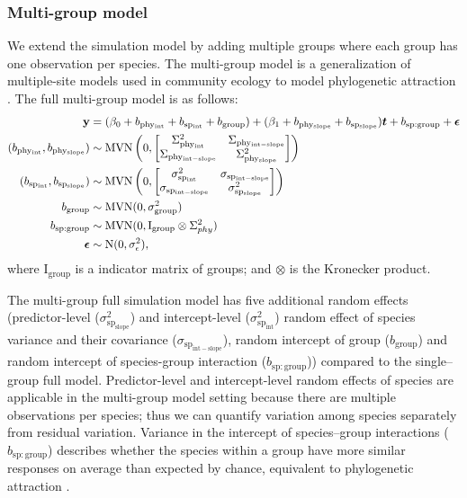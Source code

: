 \documentclass[12pt]{article}
\begin{document}
\subsubsection*{Multi-group model}

We extend the simulation model by adding multiple groups where each group has one observation per species. 
The multi-group model is a generalization of multiple-site models used in community ecology to model phylogenetic attraction \citep{helmus2007separating}. 
The full multi-group model is as follows: 
\begin{equation}
\begin{aligned}
{\mathbf y} & = (\beta_0 + b_{\mathrm{phy_{int}}} + b_{\mathrm{sp_{int}}} + b_{\mathrm{group}}) + (\beta_1 + b_{\mathrm{phy_{slope}}} + b_{\mathrm{sp_{slope}}}) \bm{t} + b_{\mathrm{sp:group}} + {\boldsymbol \epsilon} \\
(b_{\mathrm{phy_{int}}}, b_{\mathrm{phy_{slope}}}) & \sim \textrm{MVN} \left( 0, \begin{bmatrix}
\Sigma^2_{\mathrm{phy_{int}}} & \Sigma_{\mathrm{phy_{int-slope}}} \\ 
\Sigma_{\mathrm{phy_{int-slope}}} & \Sigma^2_{\mathrm{phy_{slope}}}
\end{bmatrix}
\right) \\
(b_{\mathrm{sp_{int}}}, b_{\mathrm{sp_{slope}}}) & \sim \textrm{MVN} \left( 0, \begin{bmatrix}
\sigma^2_{\mathrm{sp_{int}}} & \sigma_{\mathrm{sp_{int-slope}}} \\ 
\sigma_{\mathrm{sp_{int-slope}}} & \sigma^2_{\mathrm{sp_{slope}}}
\end{bmatrix}
\right) \\
b_{\mathrm{group}} & \sim \textrm{MVN} ( 0 , \sigma^2_{\mathrm{group}}) \\
b_{\mathrm{sp:group}} & \sim \textrm{MVN} (0, \mathrm{I}_{\mathrm{group}} \otimes \Sigma^2_{phy}) \\
{\boldsymbol \epsilon} & \sim \textrm{N} ( 0 , \sigma_{\epsilon}^2),
\label{eq:multiple_glmm}
\end{aligned}
\end{equation}
where $\textrm{I}_{\textrm{group}}$ is a indicator matrix of groups; and $\otimes$ is the Kronecker product.

The multi-group full simulation model has five additional random effects (predictor-level ($\sigma^2_{\mathrm{sp_{slope}}}$) and intercept-level ($\sigma^2_{\mathrm{sp_{int}}}$) random effect of species variance and their covariance ($\sigma_{\mathrm{sp_{int-slope}}}$), random intercept of group ($b_{\mathrm{group}}$) and random intercept of species-group interaction ($b_{\mathrm{sp:group}}$)) compared to the single--group full model.
Predictor-level and intercept-level random effects of species are applicable in the multi-group model setting because there are multiple observations per species; thus we can quantify variation among species separately from residual variation.
Variance in the intercept of species--group interactions ($b_{\mathrm{sp:group}}$) describes whether the species within a group have more similar responses on average than expected by chance, equivalent to phylogenetic attraction \citep{helmus2007separating}. 
\end{document}
